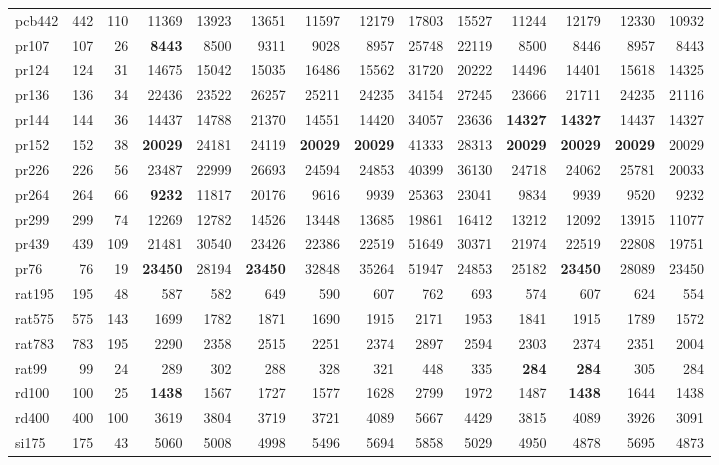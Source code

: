 {\begin{longtable}{l r r r r r r r r r r r r r}
pcb442 & 442 & 110 & 11369 & 13923 & 13651 & 11597 & 12179 & 17803 & 15527 & 11244 & 12179 & 12330 & 10932 \\
pr107 & 107 & 26 & \textbf{8443} & 8500 & 9311 & 9028 & 8957 & 25748 & 22119 & 8500 & 8446 & 8957 & 8443 \\
pr124 & 124 & 31 & 14675 & 15042 & 15035 & 16486 & 15562 & 31720 & 20222 & 14496 & 14401 & 15618 & 14325 \\
pr136 & 136 & 34 & 22436 & 23522 & 26257 & 25211 & 24235 & 34154 & 27245 & 23666 & 21711 & 24235 & 21116 \\
pr144 & 144 & 36 & 14437 & 14788 & 21370 & 14551 & 14420 & 34057 & 23636 & \textbf{14327} & \textbf{14327} & 14437 & 14327 \\
pr152 & 152 & 38 & \textbf{20029} & 24181 & 24119 & \textbf{20029} & \textbf{20029} & 41333 & 28313 & \textbf{20029} & \textbf{20029} & \textbf{20029} & 20029 \\
pr226 & 226 & 56 & 23487 & 22999 & 26693 & 24594 & 24853 & 40399 & 36130 & 24718 & 24062 & 25781 & 20033 \\
pr264 & 264 & 66 & \textbf{9232} & 11817 & 20176 & 9616 & 9939 & 25363 & 23041 & 9834 & 9939 & 9520 & 9232 \\
pr299 & 299 & 74 & 12269 & 12782 & 14526 & 13448 & 13685 & 19861 & 16412 & 13212 & 12092 & 13915 & 11077 \\
pr439 & 439 & 109 & 21481 & 30540 & 23426 & 22386 & 22519 & 51649 & 30371 & 21974 & 22519 & 22808 & 19751 \\
pr76 & 76 & 19 & \textbf{23450} & 28194 & \textbf{23450} & 32848 & 35264 & 51947 & 24853 & 25182 & \textbf{23450} & 28089 & 23450 \\
rat195 & 195 & 48 & 587 & 582 & 649 & 590 & 607 & 762 & 693 & 574 & 607 & 624 & 554 \\
rat575 & 575 & 143 & 1699 & 1782 & 1871 & 1690 & 1915 & 2171 & 1953 & 1841 & 1915 & 1789 & 1572 \\
rat783 & 783 & 195 & 2290 & 2358 & 2515 & 2251 & 2374 & 2897 & 2594 & 2303 & 2374 & 2351 & 2004 \\
rat99 & 99 & 24 & 289 & 302 & 288 & 328 & 321 & 448 & 335 & \textbf{284} & \textbf{284} & 305 & 284 \\
rd100 & 100 & 25 & \textbf{1438} & 1567 & 1727 & 1577 & 1628 & 2799 & 1972 & 1487 & \textbf{1438} & 1644 & 1438 \\
rd400 & 400 & 100 & 3619 & 3804 & 3719 & 3721 & 4089 & 5667 & 4429 & 3815 & 4089 & 3926 & 3091 \\
si175 & 175 & 43 & 5060 & 5008 & 4998 & 5496 & 5694 & 5858 & 5029 & 4950 & 4878 & 5695 & 4873 \\

\end{longtable}}
